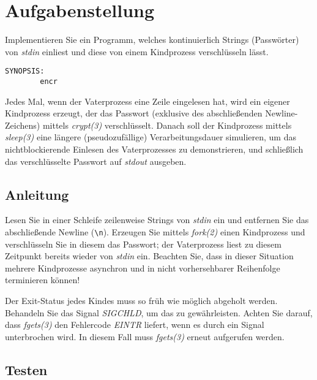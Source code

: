 




\section*{Aufgabenstellung}

Implementieren Sie ein Programm, welches kontinuierlich Strings
(Passwörter) von \emph{stdin} einliest und diese von einem Kindprozess
verschlüsseln lässt.

\begin{verbatim}
SYNOPSIS:
        encr
\end{verbatim}

Jedes Mal, wenn der Vaterprozess eine Zeile eingelesen hat, wird ein
eigener Kindprozess erzeugt, der das Passwort (exklusive des
abschließenden Newline-Zeichens) mittels \emph{crypt(3)}
verschlüsselt. Danach soll der Kindprozess mittels \emph{sleep(3)}
eine längere (pseudozufällige) Verarbeitungsdauer simulieren, um das
nichtblockierende Einlesen des Vaterprozesses zu demonstrieren, und
schließlich das verschlüsselte Passwort auf \emph{stdout} ausgeben.

\subsection*{Anleitung}

Lesen Sie in einer Schleife zeilenweise Strings von \emph{stdin} ein
und entfernen Sie das abschließende Newline (\verb+\n+). Erzeugen Sie
mittels \emph{fork(2)} einen Kindprozess und verschlüsseln Sie in
diesem das Passwort; der Vaterprozess liest zu diesem Zeitpunkt
bereits wieder von \emph{stdin} ein. Beachten Sie, dass in dieser
Situation mehrere Kindprozesse asynchron und in nicht vorhersehbarer
Reihenfolge terminieren können!

Der Exit-Status jedes Kindes muss so früh wie möglich abgeholt werden.
Behandeln Sie das Signal {\em SIGCHLD}, um das zu gewährleisten.
Achten Sie darauf, dass {\em fgets(3)} den Fehlercode {\em EINTR}
liefert, wenn es durch ein Signal unterbrochen wird. In diesem Fall
muss {\em fgets(3)} erneut aufgerufen werden.

\subsection*{Testen}

